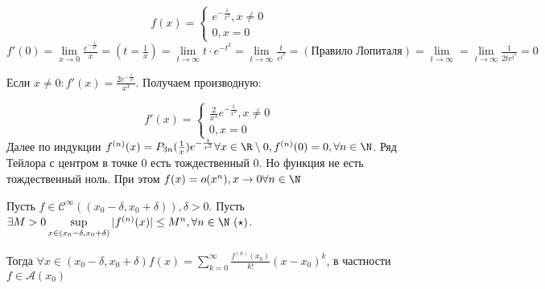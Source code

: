\begin{example}
\begin{equation*} f(x) = 
    \begin{cases}
    e^{-\frac{1}{x^2}}, x \neq 0 \\ 
    0, x = 0
    \end{cases}  
\end{equation*} 
$f'(0) = \lim\limits_{x \rightarrow 0} \frac{e^{-\frac{1}{x^2}}}{x} = (t = \frac{1}{x}) = \lim\limits_{t \rightarrow \infty} t \cdot e^{-t^2} = \lim\limits_{t \rightarrow \infty} \frac{t}{e^{t^2}} = (\text{Правило Лопиталя}) = \lim\limits_{t \rightarrow \infty} = \lim\limits_{t \rightarrow \infty} \frac{1}{2te^{t^2}} = 0$

\noindent Если $x \neq 0: f'(x) = \frac{2e^{-\frac{1}{x^2}}}{x^3}$. Получаем производную: 

\begin{equation*} f'(x) = 
    \begin{cases}
    \frac{2}{x^3}e^{-\frac{1}{x^2}}, x \neq 0 \\ 
    0, x = 0
    \end{cases}  
\end{equation*} 
Далее по индукции $f^{(n)}(x) = P_{3n}(\frac{1}{x}) e^{-\frac{1}{x^2}} \forall x \in \R \setminus {0}, f^{(n)}(0) = 0, \forall n \in \N$. Ряд Тейлора с центром в точке 0 есть тождественный 0. Но функция не есть тождественный ноль. При этом $f(x) = o(x^n), x \rightarrow 0 \forall n \in \N$
\end{example}

\begin{theorem}
    Пусть $f \in \mathcal{C}^{\infty}((x_0 - \delta, x_0 + \delta)), \delta > 0$. Пусть $\exists M > 0 \sup\limits_{x \in (x_0 - \delta, x_0 + \delta)} |f^{(n)}(x)| \le M^n, \forall n \in \N \ (\star)$. 
    
    \noindent Тогда $\forall x \in (x_0 - \delta, x_0 + \delta) f(x) = \sum\limits_{k = 0}^{\infty} \frac{f^{(k)}(x_0)}{k!}(x - x_0)^k$, в частности $f \in \mathcal{A}(x_0)$
\end{theorem}